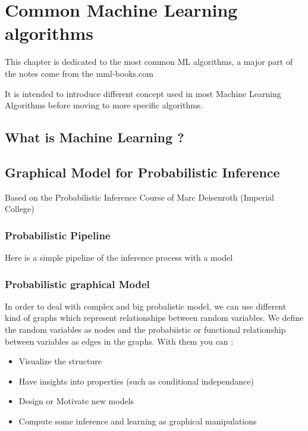 \chapter{Common Machine Learning algorithms}\label{ch:introduction}

This chapter is dedicated to the most common ML algorithms, a major part of the notes come from the mml-books.com 

It is intended to introduce different concept used in most Machine Learning Algorithms before moving to more specific algorithms.

\section{What is Machine Learning ?}

\section{Graphical Model for Probabilistic Inference}

Based on the Probabilistic Inference Course of Marc Deisenroth (Imperial College)

	\subsection{Probabilistic Pipeline}

	Here is a simple pipeline of the inference process with a model


	\subsection{Probabilistic graphical Model}

		In order to deal with complex and big probalistic model, we can use different kind of graphs which represent relationships between random variables. We define the random variables as nodes and the probabiistic or functional relationship between variables as edges in the graphs. With them you can :
		\begin{itemize}
			\item Visualize the structure
			\item Have insights into properties (such as conditional independance)
			\item Design or Motivate new models
			\item Compute some inference and learning as graphical manipulations
		\end{itemize}

